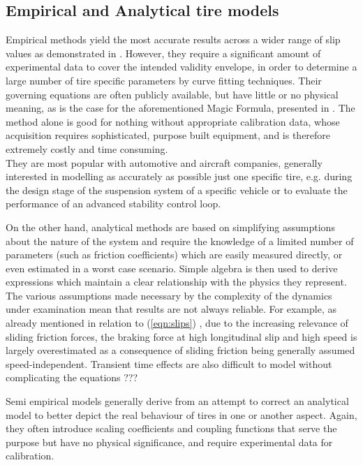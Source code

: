 \documentclass[12pt,a4paper]{report}
\newcommand{\req}[1]{
(\ref{#1})
}
\begin{document}
\subsection*{Empirical and Analytical tire models}
Empirical methods yield the most accurate results across a wider range of slip values as demonstrated in \citep{wong} \citep{sven09}. However, they require a significant amount of experimental data to cover the intended validity envelope, in order to determine a large number of tire specific parameters by curve fitting techniques. Their governing equations are often publicly available, but have little or no physical meaning, as is the case for the aforementioned Magic Formula, presented in \citep{pacejka2002}. The method alone is good for nothing without appropriate calibration data, whose acquisition requires sophisticated, purpose built equipment, and is therefore extremely costly and time consuming.\\
They are most popular with automotive and aircraft companies, generally interested in modelling as accurately as possible just one specific tire, e.g. during the design stage of the suspension system of a specific vehicle or to evaluate the performance of an advanced stability control loop.

On the other hand, analytical methods are based on simplifying assumptions about the nature of the system and require the knowledge of a limited number of parameters (such as friction coefficients) which are easily measured directly, or even estimated in a worst case scenario. Simple algebra is then used to derive expressions which maintain a clear relationship with the physics they represent.
The various assumptions made necessary by the complexity of the dynamics under examination mean that results are not always reliable. For example, as already mentioned in relation to \req{eqn:slips} , due to the increasing relevance of sliding friction forces, the braking force at high longitudinal slip and high speed is largely overestimated as a consequence of sliding friction being generally assumed speed-independent.
Transient time effects are also difficult to model without complicating the equations ???

Semi empirical models generally derive from an attempt to correct an analytical model to better depict the real behaviour of tires in one or another aspect. Again, they often introduce scaling coefficients and coupling functions that serve the purpose but have no physical significance, and require experimental data for calibration.
\end{document}
